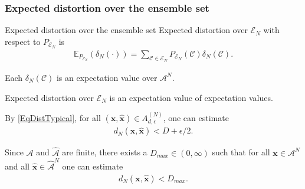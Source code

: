 \subsubsection{Expected distortion over the ensemble set}
\begin{frame}{Expected distortion over the ensemble set}
Expected distortion over $\mathcal{E}_N$ with respect to $P_{\mathcal{E}_N}$ is 
\begin{align*}%
\mathbb{E}_{P_{\mathcal{E}_N}}(\delta_N(\cdot))=\sum_{\mathcal{C}\in\mathcal{E}_N}P_{\mathcal{E}_N}(\mathcal{C})\delta_N(\mathcal{C}).
\end{align*}

\bit
\item Each $\delta_N(\mathcal{C})$ is an expectation value over $\mathcal{A}^N$.
\item [\iarrow] Expected distortion over $\mathcal{E}_N$ is an expectation value of expectation values.
\item By \eqref{EqDistTypical}, for all $(\mathbf{x},\hat{\mathbf{x}})\in A_{d,\epsilon}^{(N)}$, one can estimate
\begin{align}\label{EstDistTypical}
d_N(\mathbf{x},\hat{\mathbf{x}})<D+\epsilon/2.
\end{align}
\item Since $\mathcal{A}$ and $\hat{\mathcal{A}}$ are finite, there exists a $D_{max}\in (0,\infty)$ such that for all $\mathbf{x}\in\mathcal{A}^N$ and all $\hat{\mathbf{x}}\in{\hat{\mathcal{A}}}^N$ one can 
estimate
\begin{align}\label{EstDistAlways}
d_N(\mathbf{x},\hat{\mathbf{x}})<D_{max}.
\end{align}
\eit
\end{frame}




